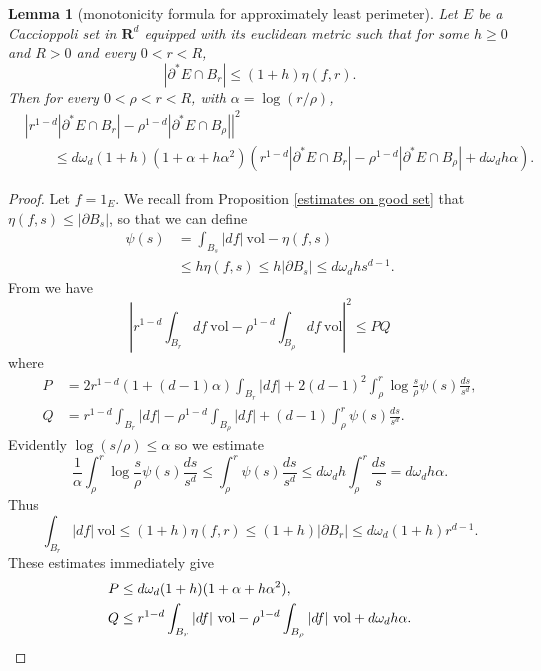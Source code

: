 \documentclass[reqno,12pt,letterpaper]{amsart}
\newcommand{\RR}{\mathbf{R}}
\newcommand{\vol}{\mathrm{vol}}
\newtheorem{lemma}[theorem]{Lemma}
\theoremstyle{definition}
\numberwithin{equation}{section}
\begin{document}
\begin{lemma}[monotonicity formula for approximately least perimeter]\label{approximate monotonicity}
Let $E$ be a Caccioppoli set in $\RR^d$ equipped with its euclidean metric such that for some $h \geq 0$ and $R > 0$ and every $0 < r < R$,
$$|\partial^* E \cap B_r| \leq (1 + h)\eta(f, r).$$
Then for every $0 < \rho < r < R$, with $\alpha = \log(r/\rho)$,
\begin{align*}
&\left|r^{1 - d} |\partial^* E \cap B_r| - \rho^{1 - d} |\partial^* E \cap B_\rho|\right|^2 \\
&\qquad \leq d\omega_d(1 + h)(1 + \alpha + h\alpha^2) \left(r^{1 - d} |\partial^* E \cap B_r| - \rho^{1 - d} |\partial^* E \cap B_\rho| + d\omega_d h \alpha\right).
\end{align*}
\end{lemma}
\begin{proof}
Let $f = 1_E$.
We recall from Proposition \ref{estimates on good set} that $\eta(f, s) \leq |\partial B_s|$, so that we can define
\begin{align*}
\psi(s) &= \int_{B_s} |df|~\vol - \eta(f, s)\\
&\leq h\eta(f, s) \leq h|\partial B_s| \leq d\omega_d hs^{d - 1}.
\end{align*}
From \cite[Proposition 5.12]{Giusti77} we have
$$\left|r^{1 - d} \int_{B_r} df ~\vol - \rho^{1 - d} \int_{B_\rho} df ~\vol\right|^2 \leq PQ$$
where
\begin{align*}
P &= 2r^{1 - d}(1 + (d - 1)\alpha) \int_{B_r} |df| + 2(d - 1)^2 \int_\rho^r \log \frac{s}{\rho} \psi(s) \frac{ds}{s^d},\\
Q &= r^{1 - d} \int_{B_r} |df| - \rho^{1 - d} \int_{B_\rho} |df| + (d - 1)\int_\rho^r \psi(s) \frac{ds}{s^d}.
\end{align*}
Evidently $\log(s/\rho) \leq \alpha$ so we estimate
$$\frac{1}{\alpha} \int_\rho^r \log \frac{s}{\rho} \psi(s) \frac{ds}{s^d} \leq \int_\rho^r \psi(s) \frac{ds}{s^d} \leq d\omega_d h \int_\rho^r \frac{ds}{s} = d\omega_d h\alpha.$$
Thus
$$\int_{B_r} |df|~\vol \leq (1 + h)\eta(f, r) \leq (1 + h)|\partial B_r| \leq d\omega_d(1 + h) r^{d - 1}.$$
These estimates immediately give
\begin{align*}
P &\leq d\omega_d(1 + h)(1 + \alpha + h\alpha^2),\\
Q &\leq r^{1 - d} \int_{B_r} |df|~\vol - \rho^{1 - d} \int_{B_\rho} |df|~\vol + d\omega_d h\alpha. \qedhere
\end{align*}
\end{proof}
\end{document}
